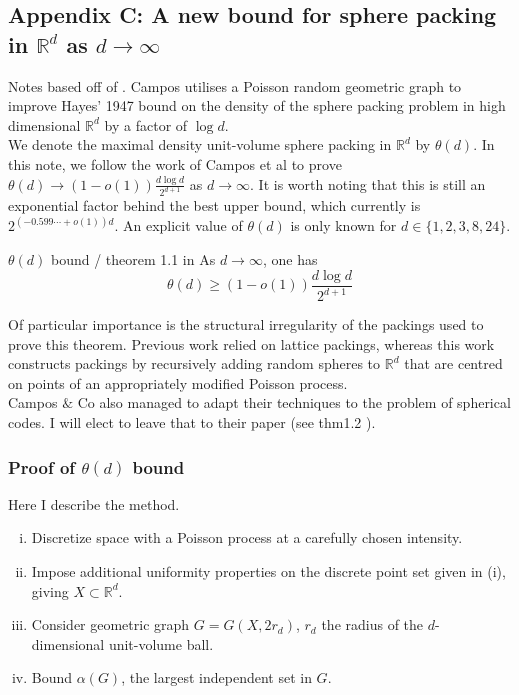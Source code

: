 \documentclass{article}
\begin{document}
\newpage 

\subsection{Appendix C: A new bound for sphere packing in $\mathbb{R}^d$ as $d \to \infty$}

Notes based off of \cite{campos2023}. Campos utilises a Poisson random geometric graph to improve Hayes' 1947 
bound on the density of the sphere packing problem in high dimensional $\mathbb{R}^d$ by a factor of $\log d$. \\

We denote the maximal density unit-volume sphere packing in $\mathbb{R}^d$ by $\theta(d)$. In this note, we follow 
the work of Campos et al to prove $\theta(d) \to (1 - o(1))\frac{d\log d}{2^{d+1}}$ as $d \to \infty$. It is worth 
noting that this is still an exponential factor behind the best upper bound, which currently is $2^{(-0.599\cdots + o(1))d}$.
An explicit value of $\theta(d)$ is only known for $d \in \{1,2,3,8,24\}$. 

\begin{theorem}[]{$\theta(d)$ bound / theorem 1.1 in \cite{campos2023}}
    As $d \to \infty$, one has \[\theta(d) \geq (1 - o(1))\frac{d\log d}{2^{d+1}}\] 
\end{theorem}

Of particular importance is the structural irregularity of the packings used to prove this theorem. Previous work 
relied on lattice packings, whereas this work constructs packings by recursively adding random spheres to $\mathbb{R}^d$
that are centred on points of an appropriately modified Poisson process. \\

Campos $\&$ Co also managed to adapt their techniques to the problem of spherical codes. I will elect to leave that 
to their paper (see thm1.2 \cite{campos2023}).

\subsubsection*{Proof of $\theta(d)$ bound}

Here I describe the method. 
\begin{enumerate}[(i)]
    \item Discretize space with a Poisson process at a carefully chosen intensity.
    \item Impose additional uniformity properties on the discrete point set given in (i), giving $X \subset \mathbb{R}^d$.
    \item Consider geometric graph $G = G(X, 2r_d)$, $r_d$ the radius of the $d$-dimensional unit-volume ball.
    \item Bound $\alpha(G)$, the largest independent set in $G$. 
\end{enumerate}
\end{document}

